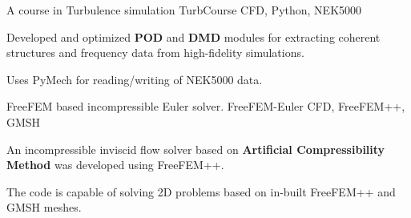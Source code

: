 \begin{cventries}
  \cventry
  {A course in Turbulence simulation} %
  {TurbCourse} %
  {CFD, Python, NEK5000} %
  {} %
  {
    \begin{cvitems} %
      \item {Developed and optimized \textbf{POD} and \textbf{DMD} modules for extracting coherent structures and frequency data from high-fidelity simulations.}
      \item {Uses PyMech for reading/writing of NEK5000 data.}
    \end{cvitems}
  }
  \cventry
  {FreeFEM based incompressible Euler solver.} %
  {FreeFEM-Euler} %
  {CFD, FreeFEM++, GMSH} %
  {} %
  {
    \begin{cvitems} %
      \item {An incompressible inviscid flow solver based on \textbf{Artificial Compressibility Method} was developed using FreeFEM++.}
      \item {The code is capable of solving 2D problems based on in-built FreeFEM++ and GMSH meshes.}
    \end{cvitems}
  }

\end{cventries}
